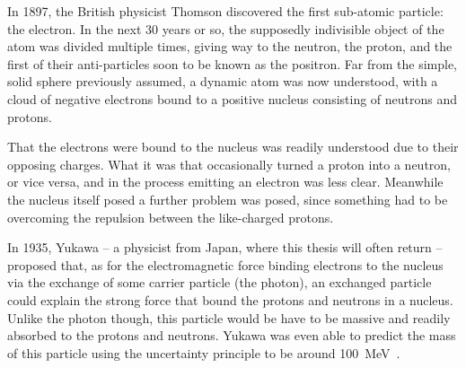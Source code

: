 In 1897, the British physicist Thomson discovered the first sub-atomic particle: the electron.
In the next 30 years or so, the supposedly indivisible object of the atom was divided multiple times, giving way to the neutron, the proton, and the first of their anti-particles soon to be known as the positron.
Far from the simple, solid sphere previously assumed, a dynamic atom was now understood, with a cloud of negative electrons bound to a positive nucleus consisting of neutrons and protons.

That the electrons were bound to the nucleus was readily understood due to their opposing charges.
What it was that occasionally turned a proton into a neutron, or vice versa, and in the process emitting an electron was less clear.
Meanwhile the nucleus itself posed a further problem was posed, since something had to be overcoming the repulsion between the like-charged protons.

In 1935, Yukawa -- a physicist from Japan, where this thesis will often return -- proposed that, as for the electromagnetic force binding electrons to the nucleus via the exchange of some carrier particle (the photon), 
an exchanged particle could explain the strong force that bound the protons and neutrons in a nucleus.
Unlike the photon though, this particle would be have to be massive and readily absorbed to the protons and neutrons.
Yukawa was even able to predict the mass of this particle using the uncertainty principle to be around 100~MeV~\cite{}.

